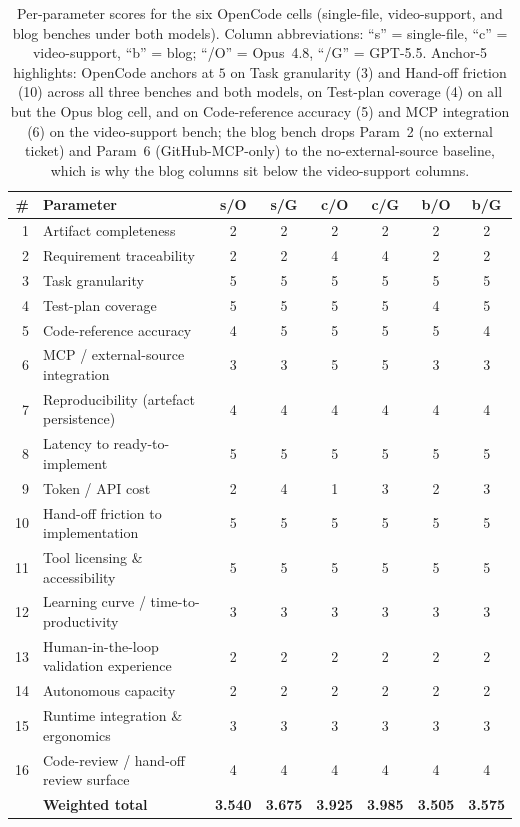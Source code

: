 \begin{table}[h]
\centering
\caption{Per-parameter scores for the six OpenCode cells
(single-file, video-support, and blog benches under both models).
Column abbreviations: ``s'' = single-file, ``c'' = video-support, ``b'' = blog;
``/O'' = Opus~4.8, ``/G'' = GPT-5.5. Anchor-5 highlights:
OpenCode anchors at $5$ on Task granularity (3) and Hand-off friction
(10) across all three benches and both models, on Test-plan coverage
(4) on all but the Opus blog cell, and on Code-reference accuracy (5)
and MCP integration (6) on the video-support bench; the blog bench
drops Param~2 (no external ticket) and Param~6 (GitHub-MCP-only) to
the no-external-source baseline, which is why the blog columns sit
below the video-support columns.}
\label{tab:opencode-per-param}
\setlength{\tabcolsep}{4pt}
\begin{tabular}{rp{5.2cm}cccccc}
\toprule
\# & Parameter & s/O & s/G & c/O & c/G & b/O & b/G \\
\midrule
1  & Artifact completeness                    & 2 & 2 & 2 & 2 & 2 & 2 \\
2  & Requirement traceability                 & 2 & 2 & 4 & 4 & 2 & 2 \\
3  & Task granularity                         & 5 & 5 & 5 & 5 & 5 & 5 \\
4  & Test-plan coverage                       & 5 & 5 & 5 & 5 & 4 & 5 \\
5  & Code-reference accuracy                  & 4 & 5 & 5 & 5 & 5 & 4 \\
6  & MCP / external-source integration        & 3 & 3 & 5 & 5 & 3 & 3 \\
7  & Reproducibility (artefact persistence)   & 4 & 4 & 4 & 4 & 4 & 4 \\
8  & Latency to ready-to-implement            & 5 & 5 & 5 & 5 & 5 & 5 \\
9  & Token / API cost                         & 2 & 4 & 1 & 3 & 2 & 3 \\
10 & Hand-off friction to implementation      & 5 & 5 & 5 & 5 & 5 & 5 \\
11 & Tool licensing \& accessibility          & 5 & 5 & 5 & 5 & 5 & 5 \\
12 & Learning curve / time-to-productivity    & 3 & 3 & 3 & 3 & 3 & 3 \\
13 & Human-in-the-loop validation experience  & 2 & 2 & 2 & 2 & 2 & 2 \\
14 & Autonomous capacity                      & 2 & 2 & 2 & 2 & 2 & 2 \\
15 & Runtime integration \& ergonomics        & 3 & 3 & 3 & 3 & 3 & 3 \\
16 & Code-review / hand-off review surface    & 4 & 4 & 4 & 4 & 4 & 4 \\
\midrule
   & \textbf{Weighted total}                  & \textbf{3.540} & \textbf{3.675} & \textbf{3.925} & \textbf{3.985} & \textbf{3.505} & \textbf{3.575} \\
\bottomrule
\end{tabular}
\end{table}

